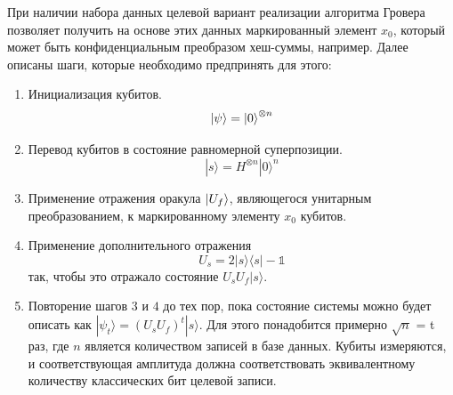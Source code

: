 \documentclass{mrl}
\begin{document}
При наличии набора данных целевой вариант реализации алгоритма Гровера позволяет получить на основе этих данных маркированный элемент $x_0$, который может быть конфиденциальным преобразом хеш-суммы, например. Далее описаны шаги, которые необходимо предпринять для этого:

\begin{enumerate}
\item Инициализация кубитов.
    \[ \ket{\psi} = \ket{0} ^ {\otimes n} \]
\item Перевод кубитов в состояние равномерной суперпозиции.
    \[ | s \rangle = H^{\otimes n} | 0 \rangle^n \]
\item Применение отражения оракула $\ket{U_f}$, являющегося унитарным преобразованием, к маркированному элементу $x_0$ кубитов.

\item Применение дополнительного отражения
    \[ U_s = 2|s\rangle\langle s| - \mathbb{1} \]
так, чтобы это отражало состояние $U_s U_f| s \rangle$.

\item Повторение шагов $3$ и $4$ до тех пор, пока состояние системы можно будет описать как $| \psi_t \rangle = (U_s U_f)^t  | s \rangle$. Для этого понадобится примерно $\sqrt{n}$ = t раз, где $n$ является количеством записей в базе данных. Кубиты измеряются, и соответствующая амплитуда должна соответствовать эквивалентному количеству классических бит целевой записи.
\end{enumerate}
\end{document}
